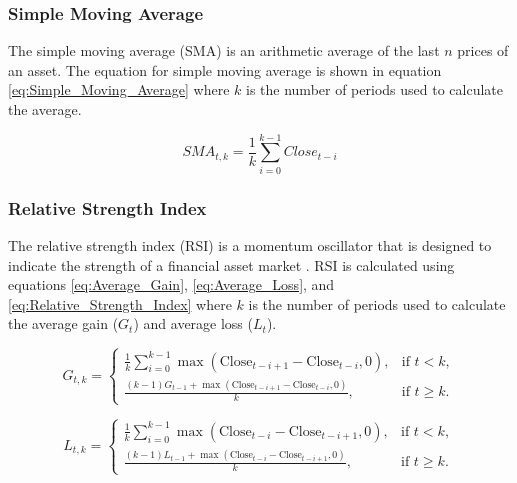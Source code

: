 \documentclass[journal]{new-aiaa}
\begin{document}
\subsubsection{Simple Moving Average}\label{sec:Technical_Analysis:Simple_Moving_Average}
The simple moving average (SMA) is an arithmetic average of the last $n$ prices of an asset.
The equation for simple moving average is shown in equation \ref{eq:Simple_Moving_Average} where $k$ is the number of periods used to calculate the average.

\begin{equation}\label{eq:Simple_Moving_Average}
        SMA_{t,k} = \frac{1}{k} \sum_{i=0}^{k-1} Close_{t-i}
\end{equation}

\subsubsection{Relative Strength Index}\label{sec:Technical_Analysis:Relative_Strength_Index}
The relative strength index (RSI) is a momentum oscillator that is designed to indicate the strength of a financial asset market \cite{wilder1978new}.
RSI is calculated using equations \ref{eq:Average_Gain}, \ref{eq:Average_Loss}, and \ref{eq:Relative_Strength_Index} where $k$ is the number of periods used to calculate the average gain ($G_t$) and average loss ($L_t$).

\begin{equation}\label{eq:Average_Gain}
        G_{t,k} = 
        \begin{cases} 
                \frac{1}{k}\sum_{i=0}^{k-1}\max\left(\text{Close}_{t-i+1} - \text{Close}_{t-i}, 0\right), & \text{if } t < k, \\[10pt]
                \frac{(k-1)G_{t-1} + \max\left( \text{Close}_{t-i+1} - \text{Close}_{t-i}, 0 \right)}{k}, & \text{if } t \geq k.
        \end{cases}
\end{equation}

\begin{equation}\label{eq:Average_Loss}
        L_{t,k} = 
        \begin{cases} 
                \frac{1}{k}\sum_{i=0}^{k-1}\max\left(\text{Close}_{t-i} - \text{Close}_{t-i+1}, 0\right), & \text{if } t < k, \\[10pt]
                \frac{(k-1)L_{t-1} + \max\left( \text{Close}_{t-i} - \text{Close}_{t-i+1}, 0 \right)}{k}, & \text{if } t \geq k.
        \end{cases}
\end{equation}
\end{document}
